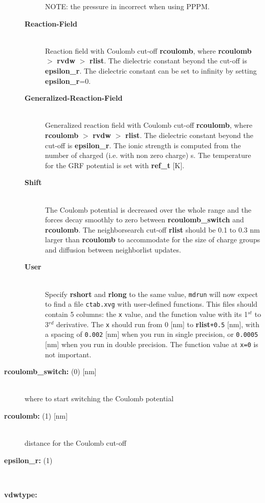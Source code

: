 \begin{description}
\begin{description}
NOTE: the pressure in incorrect when using PPPM.
\item[{\bf Reaction-Field}]\mbox{}\\
Reaction field with Coulomb cut-off {\bf rcoulomb},
where {\bf rcoulomb} {\tt $>$} {\bf rvdw} {\tt $>$} {\bf rlist}.
The dielectric constant beyond the cut-off is {\bf epsilon\_r}.
The dielectric constant can be set to infinity by setting {\bf epsilon\_r}=0.
\item[{\bf Generalized-Reaction-Field}]\mbox{}\\
Generalized reaction field with Coulomb cut-off {\bf rcoulomb},
where {\bf rcoulomb} {\tt $>$} {\bf rvdw} {\tt $>$} {\bf rlist}.
The dielectric constant beyond the cut-off is {\bf epsilon\_r}.
The ionic strength is computed from the number of charged 
(i.e. with non zero charge) s.
The temperature for the GRF potential is set with 
{\bf ref\_t} [K].
\item[{\bf Shift}]\mbox{}\\
The Coulomb
potential is decreased over the whole range and the forces decay smoothly
to zero between {\bf rcoulomb\_switch} and {\bf rcoulomb}.
The neighborsearch cut-off {\bf rlist} should be 0.1 to 0.3 nm larger than
{\bf rcoulomb} to accommodate for the size of charge groups and diffusion
between neighborlist updates.
\item[{\bf User}]\mbox{}\\
Specify {\bf rshort} and {\bf rlong} to the same value, {\tt mdrun}
will now expect to find a file {\tt ctab.xvg} with user-defined functions.
This files should contain 5 columns:
the {\tt x} value, and the function value with its 1$^{st}$
to 3$^{rd}$ derivative. The {\tt x} should run from 0 [nm] to
{\bf rlist}{\tt +0.5} [nm], with a spacing of {\tt 0.002}
[nm] when you run in single precision, or {\tt 0.0005} [nm] when
you run in double precision. The function value at {\tt x=0} is not
important.
\end{description}
\item[{\bf rcoulomb\_switch: }(0) {[nm]}]\mbox{}\\
where to start switching the Coulomb potential
\item[{\bf rcoulomb: }(1) {[nm]}]\mbox{}\\
distance for the Coulomb cut-off
\item[{\bf epsilon\_r: }(1)]\mbox{}\\
\item[{\bf vdwtype:}]\mbox{}\\

\end{description}
